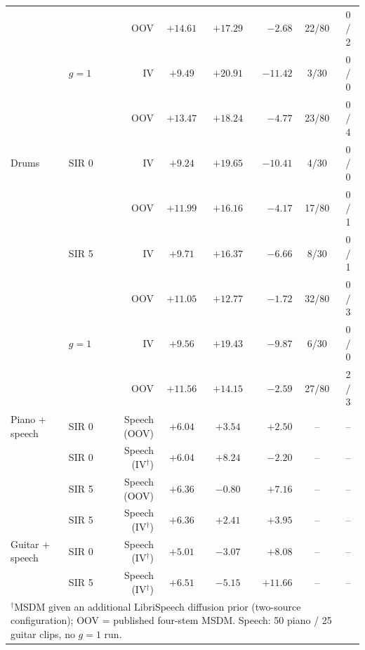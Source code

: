 \begin{table}[t]
\begin{tabular}{@{}llrccrcc@{}}
 &  & OOV & $+14.61$ & $\mathbf{+17.29}$ & $-2.68$ & 22/80 & 0 / 2 \\
 & $g{=}1$ & IV & $+9.49$ & $\mathbf{+20.91}$ & $-11.42$ & 3/30 & 0 / 0 \\
 &  & OOV & $+13.47$ & $\mathbf{+18.24}$ & $-4.77$ & 23/80 & 0 / 4 \\
\midrule
Drums & SIR 0 & IV & $+9.24$ & $\mathbf{+19.65}$ & $-10.41$ & 4/30 & 0 / 0 \\
 &  & OOV & $+11.99$ & $\mathbf{+16.16}$ & $-4.17$ & 17/80 & 0 / 1 \\
 & SIR 5 & IV & $+9.71$ & $\mathbf{+16.37}$ & $-6.66$ & 8/30 & 0 / 1 \\
 &  & OOV & $+11.05$ & $\mathbf{+12.77}$ & $-1.72$ & 32/80 & 0 / 3 \\
 & $g{=}1$ & IV & $+9.56$ & $\mathbf{+19.43}$ & $-9.87$ & 6/30 & 0 / 0 \\
 &  & OOV & $+11.56$ & $\mathbf{+14.15}$ & $-2.59$ & 27/80 & 2 / 3 \\
\midrule
Piano + speech & SIR 0 & Speech (OOV) & $\mathbf{+6.04}$ & $+3.54$ & $+2.50$ & -- & -- \\
 & SIR 0 & Speech (IV$^\dagger$) & $+6.04$ & $\mathbf{+8.24}$ & $-2.20$ & -- & -- \\
 & SIR 5 & Speech (OOV) & $\mathbf{+6.36}$ & $-0.80$ & $+7.16$ & -- & -- \\
 & SIR 5 & Speech (IV$^\dagger$) & $\mathbf{+6.36}$ & $+2.41$ & $+3.95$ & -- & -- \\
Guitar + speech & SIR 0 & Speech (IV$^\dagger$) & $\mathbf{+5.01}$ & $-3.07$ & $+8.08$ & -- & -- \\
 & SIR 5 & Speech (IV$^\dagger$) & $\mathbf{+6.51}$ & $-5.15$ & $+11.66$ & -- & -- \\
\bottomrule
\multicolumn{8}{l}{\footnotesize $^\dagger$MSDM given an additional LibriSpeech diffusion prior (two-source configuration); OOV = published four-stem MSDM. Speech: 50 piano / 25 guitar clips, no $g{=}1$ run.}
\end{tabular}
\end{table}

